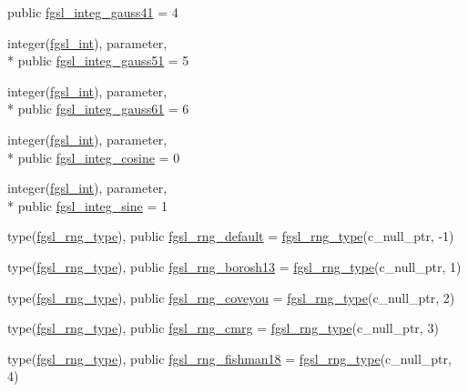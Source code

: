 \begin{DoxyCompactItemize}
public \hyperlink{classfgsl_a5c219f8f951d411c63849088e0e224da}{fgsl\-\_\-integ\-\_\-gauss41} = 4
\item 
integer(\hyperlink{classfgsl_a222deda1d7a0c0e845ce4a683318efeb}{fgsl\-\_\-int}), parameter, \\*
public \hyperlink{classfgsl_a8331538c5a42b13f0893e34864bae6d7}{fgsl\-\_\-integ\-\_\-gauss51} = 5
\item 
integer(\hyperlink{classfgsl_a222deda1d7a0c0e845ce4a683318efeb}{fgsl\-\_\-int}), parameter, \\*
public \hyperlink{classfgsl_ac82cf20c4bb7b1f3a6053020016abfed}{fgsl\-\_\-integ\-\_\-gauss61} = 6
\item 
integer(\hyperlink{classfgsl_a222deda1d7a0c0e845ce4a683318efeb}{fgsl\-\_\-int}), parameter, \\*
public \hyperlink{classfgsl_a32ea398e71abe5dd44ef510e11dcfa87}{fgsl\-\_\-integ\-\_\-cosine} = 0
\item 
integer(\hyperlink{classfgsl_a222deda1d7a0c0e845ce4a683318efeb}{fgsl\-\_\-int}), parameter, \\*
public \hyperlink{classfgsl_a4cc7312b9db6359e7b0cdc32f98ce88d}{fgsl\-\_\-integ\-\_\-sine} = 1
\item 
type(\hyperlink{structfgsl_1_1fgsl__rng__type}{fgsl\-\_\-rng\-\_\-type}), public \hyperlink{classfgsl_ab8c31f8079ad3a768a528cd525c8ccf2}{fgsl\-\_\-rng\-\_\-default} = \hyperlink{structfgsl_1_1fgsl__rng__type}{fgsl\-\_\-rng\-\_\-type}(c\-\_\-null\-\_\-ptr, -\/1)
\item 
type(\hyperlink{structfgsl_1_1fgsl__rng__type}{fgsl\-\_\-rng\-\_\-type}), public \hyperlink{classfgsl_afcf3a859944205f1a11e0dc35e13e608}{fgsl\-\_\-rng\-\_\-borosh13} = \hyperlink{structfgsl_1_1fgsl__rng__type}{fgsl\-\_\-rng\-\_\-type}(c\-\_\-null\-\_\-ptr, 1)
\item 
type(\hyperlink{structfgsl_1_1fgsl__rng__type}{fgsl\-\_\-rng\-\_\-type}), public \hyperlink{classfgsl_a8eb316ba1f0e42680fb05bf4444f3018}{fgsl\-\_\-rng\-\_\-coveyou} = \hyperlink{structfgsl_1_1fgsl__rng__type}{fgsl\-\_\-rng\-\_\-type}(c\-\_\-null\-\_\-ptr, 2)
\item 
type(\hyperlink{structfgsl_1_1fgsl__rng__type}{fgsl\-\_\-rng\-\_\-type}), public \hyperlink{classfgsl_a46ec4ab895207c6e3da1a2adb29bb0ff}{fgsl\-\_\-rng\-\_\-cmrg} = \hyperlink{structfgsl_1_1fgsl__rng__type}{fgsl\-\_\-rng\-\_\-type}(c\-\_\-null\-\_\-ptr, 3)
\item 
type(\hyperlink{structfgsl_1_1fgsl__rng__type}{fgsl\-\_\-rng\-\_\-type}), public \hyperlink{classfgsl_a8f22f1b0b7e5d37d485553834c96b959}{fgsl\-\_\-rng\-\_\-fishman18} = \hyperlink{structfgsl_1_1fgsl__rng__type}{fgsl\-\_\-rng\-\_\-type}(c\-\_\-null\-\_\-ptr, 4)

\end{DoxyCompactItemize}
